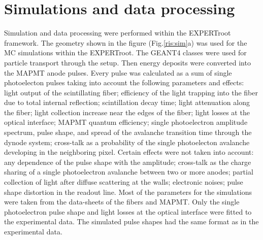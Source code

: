 \documentclass{webofc}
\newcommand{\er}{\textmd{EXPERTroot}}
\begin{document}
\section{Simulations and data processing}

Simulation and data processing were performed within the \er\, framework. The geometry shown in the figure (Fig.\ref{ris:sim}a) was used for the MC simulations within the \er. The GEANT4\cite{geant4} classes were used for particle transport through the setup. Then energy deposits were  converted into the MAPMT anode pulses. Every pulse was calculated as a sum of single photoelecton pulses taking into account the following parameters and effects: light output of the scintillating fiber; efficiency of the light trapping into the fiber due to total internal reflection; scintillation decay time; light attenuation along the fiber; light collection increase near the edges of the fiber; light losses at the optical interface; MAPMT quantum efficiency; single photoelectron amplitude spectrum, pulse shape, and spread of the avalanche transition time through the dynode system; cross-talk as a probability of the single photoelecton avalanche developing in the neighboring pixel.
Certain effects were not taken into account: any dependence of the pulse shape with the amplitude; cross-talk as the charge sharing of a single photoelectron avalanche between two or more anodes; partial collection of light after diffuse scattering at the walls; electronic noises; pulse shape distortion in the readout line. Most of the parameters for the simulations were taken from the data-sheets of the fibers and MAPMT.  Only the single photoelectron pulse shape and light losses at the optical interface were fitted to the experimental data. The simulated pulse shapes had the same format as in the experimental data.
\end{document}
